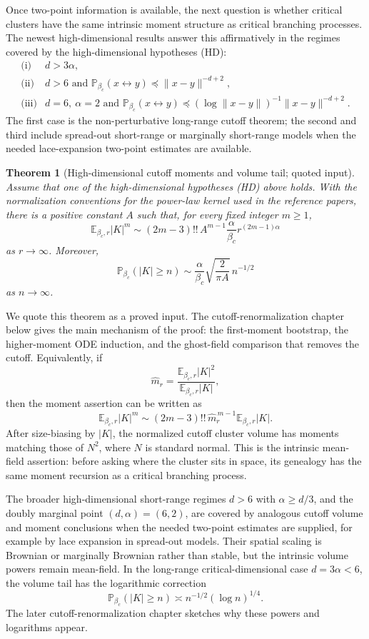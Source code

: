 \documentclass[11pt,reqno]{book}
\numberwithin{equation}{chapter}
\theoremstyle{plain}
\newtheorem{theorem}{Theorem}[chapter]
\theoremstyle{definition}
\theoremstyle{remark}
\renewcommand{\P}{\mathbb P}
\newcommand{\E}{\mathbb E}
\newcommand{\1}{\mathbf 1}
\newcommand{\norm}[1]{\lVert #1\rVert}
\newcommand{\pre}{\preceq}
\begin{document}
Once two-point information is available, the next question is whether critical clusters have the same intrinsic moment structure as critical branching processes. The newest high-dimensional results answer this affirmatively in the regimes covered by the high-dimensional hypotheses (HD):
\[
\begin{array}{ll}
\text{(i)} & d>3\alpha,\\
\text{(ii)} & d>6\text{ and }\P_{\beta_c}(x\leftrightarrow y)\pre \norm{x-y}^{-d+2},\\
\text{(iii)} & d=6,\ \alpha=2\text{ and }
  \P_{\beta_c}(x\leftrightarrow y)\pre
  (\log\norm{x-y})^{-1}\norm{x-y}^{-d+2}.
\end{array}
\]
The first case is the non-perturbative long-range cutoff theorem; the second and third include spread-out short-range or marginally short-range models when the needed lace-expansion two-point estimates are available.

\begin{theorem}[High-dimensional cutoff moments and volume tail; quoted input]
\label{thm:hd-cutoff-moments-book}
Assume that one of the high-dimensional hypotheses \emph{(HD)} above holds.
With the normalization conventions for the power-law kernel used in the
reference papers, there is a positive constant \(A\) such that, for every
fixed integer \(m\geq1\),
\[
  \E_{\beta_c,r}|K|^m
  \sim
  (2m-3)!!\,A^{m-1}\frac{\alpha}{\beta_c}
  r^{(2m-1)\alpha}
\]
as \(r\to\infty\). Moreover,
\[
  \mathbb P_{\beta_c}(|K|\geq n)
  \sim
  \frac{\alpha}{\beta_c}\sqrt{\frac{2}{\pi A}}\,
  n^{-1/2}
\]
as \(n\to\infty\).
\end{theorem}

We quote this theorem as a proved input. The cutoff-renormalization chapter
below gives the main mechanism of the proof: the first-moment bootstrap, the
higher-moment ODE induction, and the ghost-field comparison that removes the
cutoff. Equivalently, if
\[
  \widehat m_r
  =
  \frac{\E_{\beta_c,r}|K|^2}{\E_{\beta_c,r}|K|},
\]
then the moment assertion can be written as
\[
  \E_{\beta_c,r}|K|^m
  \sim
  (2m-3)!!\,\widehat m_r^{\,m-1}\E_{\beta_c,r}|K|.
\]
After size-biasing by \(|K|\), the normalized cutoff cluster volume has
moments matching those of \(N^2\), where \(N\) is standard normal. This is the
intrinsic mean-field assertion: before asking where the cluster sits in
space, its genealogy has the same moment recursion as a critical branching
process.

The broader high-dimensional short-range regimes \(d>6\) with \(\alpha\geq d/3\), and the doubly marginal point \((d,\alpha)=(6,2)\), are covered by analogous cutoff volume and moment conclusions when the needed two-point estimates are supplied, for example by lace expansion in spread-out models. Their spatial scaling is Brownian or marginally Brownian rather than stable, but the intrinsic volume powers remain mean-field. In the long-range critical-dimensional case \(d=3\alpha<6\), the volume tail has the logarithmic correction
\[
  \mathbb P_{\beta_c}(|K|\geq n)\asymp n^{-1/2}(\log n)^{1/4}.
\]
The later cutoff-renormalization chapter sketches why these powers and logarithms appear.
\end{document}
